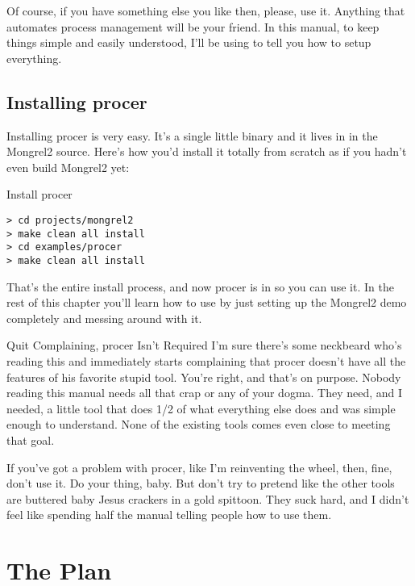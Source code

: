 Of course, if you have something else you like then, please, use it.  Anything that automates
process management will be your friend.  In this manual, to keep things simple and easily
understood, I'll be using  to tell you how to setup everything.

\subsection{Installing procer}

Installing procer is very easy.  It's a single little binary and it lives in
 in the Mongrel2 source.  Here's how you'd install it
totally from scratch as if you hadn't even build Mongrel2 yet:

\begin{code}{Install procer}
\begin{Verbatim}
> cd projects/mongrel2
> make clean all install
> cd examples/procer
> make clean all install
\end{Verbatim}
\end{code}

That's the entire install process, and now procer is in 
so you can use it.  In the rest of this chapter you'll learn how to use 
by just setting up the Mongrel2 demo completely and messing around with it.


\begin{aside}{Quit Complaining, procer Isn't Required}
I'm sure there's some neckbeard who's reading this and immediately starts
complaining that procer doesn't have all the features of his favorite
stupid tool.  You're right, and that's on purpose.  Nobody reading this
manual needs all that crap or any of your dogma.  They need, and I needed,
a little tool that does 1/2 of what everything else does and was simple
enough to understand.  None of the existing tools comes even close to
meeting that goal.

If you've got a problem with procer, like I'm reinventing the wheel, then,
fine, don't use it.  Do your thing, baby.  But don't try to pretend like
the other tools are buttered baby Jesus crackers in a gold spittoon.
They suck hard, and I didn't feel like spending half the manual telling
people how to use them.
\end{aside}


\section{The Plan}

